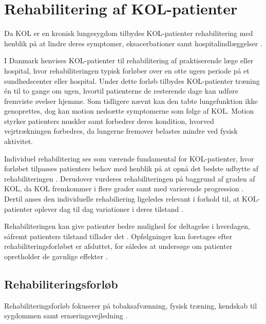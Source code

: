 \section{Rehabilitering af KOL-patienter} \label{sec:rehabilitering}
Da KOL er en kronisk lungesygdom tilbydes KOL-patienter rehabilitering med henblik på at lindre deres symptomer, eksacerbationer samt hospitalindlæggelser \cite{Hellem2012,Williams2014}. 

I Danmark henvises KOL-patienter til rehabilitering af praktiserende læge eller hospital, hvor rehabiliteringen typisk forløber over en otte ugers periode på et sundhedscenter eller hospital. Under dette forløb tilbydes KOL-patienter træning én til to gange om ugen, hvortil patienterne de resterende dage kan udføre fremviste øvelser hjemme.\cite{McCarthy2015,Frausing2011b} Som tidligere nævnt kan den tabte lungefunktion ikke genoprettes, dog kan motion nedsætte symptomerne som følge af KOL. Motion styrker patienters muskler samt forbedrer deres kondition, hvorved vejrtrækningen forbedres, da lungerne fremover belastes mindre ved fysisk aktivitet.\cite{Lungeforeningen2016}

Individuel rehabilitering ses som værende fundamental for KOL-patienter, hvor forløbet tilpasses patienters behov med henblik på at opnå det bedste udbytte af rehabiliteringen \cite{McCarthy2015,Habraken2011,Sundhedsstyrelsen2015}. Derudover vurderes rehabiliteringen på baggrund af graden af KOL, da KOL fremkommer i flere grader samt med varierende progression \cite{McCarthy2015}. Dertil anses den individuelle rehabiliering ligeledes relevant i forhold til, at KOL-patienter oplever dag til dag variationer i deres tilstand \cite{Hellem2012}. 

Rehabiliteringen kan give patienter bedre mulighed for deltagelse i hverdagen, såfremt patienters tilstand tillader det \cite{McCarthy2015,Habraken2011, Sundhedsstyrelsen2015}. Opfølgninger kan foretages efter rehabiliteringsforløbet er afsluttet, for således at undersøge om patienter opretholder de gavnlige effekter \cite{Frausing2011b}.


\subsection{Rehabiliteringsforløb}
Rehabiliteringsforløb fokuserer på tobaksafvænning, fysisk træning, kendskab til sygdommen samt ernæringsvejledning \cite{McCarthy2015,Habraken2011,Sundhedsstyrelsen2015}.

